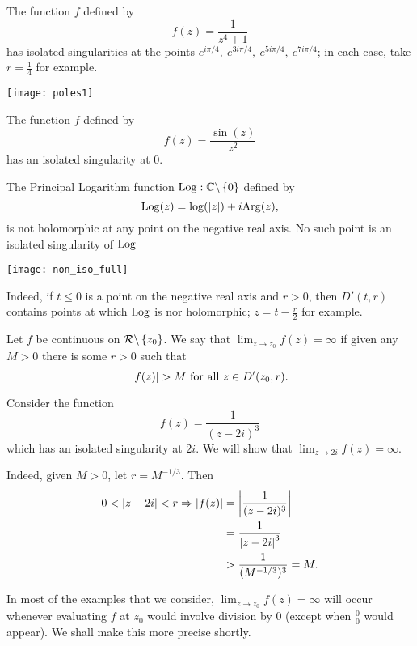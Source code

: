 \begin{example}
The function $f$ defined by
\[
f(z) = \frac{1}{z^4+1}
\]
has isolated singularities at the points $e^{i\pi/4},\ e^{3i\pi/4},\ e^{5i\pi/4},\ e^{7i\pi/4}$; in each case, take $r = \frac{1}{4}$ for example.
\begin{center}
\texttt{[image: poles1]}
\end{center}

\end{example}
\begin{example}
The function $f$ defined by
\[
f(z) = \frac{\sin (z)}{z^2}
\]
has an isolated singularity at $0$.
\end{example}
\begin{example}
The Principal Logarithm function $\operatorname{Log} : \mathbb{C} \backslash \left\{0\right\}$ defined by
\[
\operatorname{Log} (z) = \log(\left| z \right|) + i \mathrm{Arg} (z),
\]
is not holomorphic at any point on the negative real axis.  No such point is an isolated singularity of $\operatorname{Log}$
\begin{center}
\texttt{[image: non\_iso\_full]}
\end{center}
Indeed, if $t \leq 0$ is a point on the negative real axis and $r>0$, then $D'(t,r)$ contains points at which $\operatorname{Log}$ is nor holomorphic; $z=t-\frac{r}{2}$ for example.
\end{example}
\begin{definition}  
Let $f$ be continuous on $\mathcal{R} \backslash \left\{z_0\right\}$. We say that $\displaystyle \lim_{z \to z_0} f(z) = \infty$ if given any $M>0$ there is some $r>0$ such that
\[
\abs{f(z)}>M \text{ for all } z \in D'(z_0,r).
\]
\end{definition}
\begin{example}

Consider the function
\[
f(z) = \frac{1}{(z-2i)^3}
\]
which has an isolated singularity at $2i$.  We will show that $\displaystyle \lim_{z \to 2i} f(z) = \infty$.

Indeed, given $M>0$, let $r=M^{-1/3}$.  Then 
\begin{align*}
0 < \left| z-2i \right| < r \Rightarrow \left| f(z) \right| &= \left| \frac{1}{(z-2i)^3} \right|\\
& = \frac{1}{\left| z-2i \right|^3} \\
& > \frac{1}{(M^{-1/3})^3} = M.
\end{align*}
\end{example}
In most of the examples that we consider, $\displaystyle \lim_{z \to z_0} f(z) = \infty$ will occur whenever evaluating $f$ at $z_0$ would involve division by $0$ (except when $\frac{0}{0}$ would appear).  We shall make this more precise shortly.

